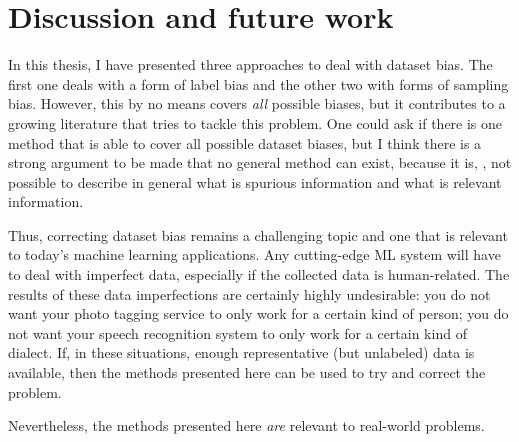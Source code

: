 \chapter{Discussion and future work}\label{ch:conclusion}
In this thesis, I have presented three approaches to deal with dataset bias.
The first one deals with a form of label bias and the other two with forms of sampling bias.
However, this by no means covers \emph{all} possible biases,
but it contributes to a growing literature that tries to tackle this problem.
One could ask if there is one method that is able to cover all possible dataset biases,
but I think there is a strong argument to be made that no general method can exist,
because it is, \eg, not possible to describe in general what is spurious information and what is relevant information.

Thus, correcting dataset bias remains a challenging topic
and one that is relevant to today's machine learning applications.
Any cutting-edge \ac{ML} system will have to deal with imperfect data,
especially if the collected data is human-related.
The results of these data imperfections are certainly highly undesirable:
you do not want your photo tagging service to only work for a certain kind of person;
you do not want your speech recognition system to only work for a certain kind of dialect.
If, in these situations, enough representative (but unlabeled) data is available,
then the methods presented here can be used to try and correct the problem.



Nevertheless, the methods presented here \emph{are} relevant to real-world problems.
